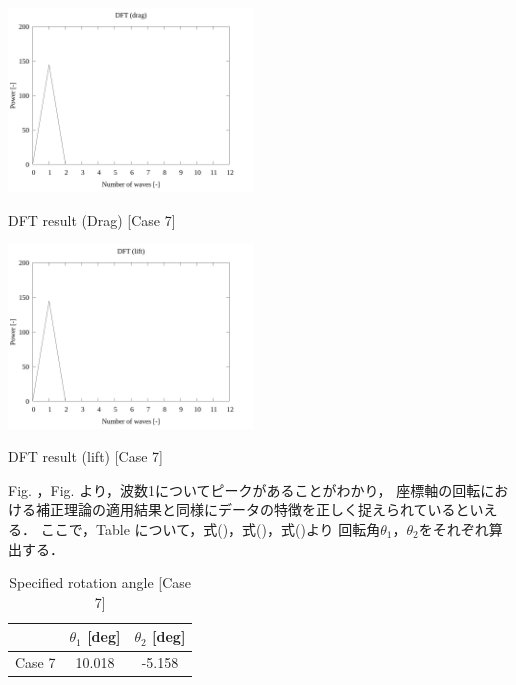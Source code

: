 \newpage

\begin{multicols}{2}
    \begin{figure_here}
        \begin{center}
        \includegraphics[width=65mm]{../../02_workspace/result/simulation_tx=10.0_ty=-5.0_dx=5.00_dy=-2.50/plot/07/07-3_dft-drag.png}
        \caption{DFT result (Drag) [Case 7]}
        \includegraphics[width=65mm]{../../02_workspace/result/simulation_tx=10.0_ty=-5.0_dx=5.00_dy=-2.50/plot/07/07-4_dft-lift.png}
        \caption{DFT result (lift) [Case 7]}
        \end{center}
    \end{figure_here}
\end{multicols}

Fig. ，Fig. より，波数1についてピークがあることがわかり，
座標軸の回転における補正理論の適用結果と同様にデータの特徴を正しく捉えられているといえる．
ここで，Table について，式()，式()，式()より
回転角$\theta_1$，$\theta_2$をそれぞれ算出する．

\begin{table}[htbp]
    \begin{center}
        \caption{Specified rotation angle [Case 7]}
        \begin{tabular}{|p{30mm}|p{20mm}|p{20mm}|}
            \hline
            \multicolumn{1}{|c|}{}       & \multicolumn{1}{|c|}{$\theta_1$ [deg]}   & \multicolumn{1}{|c|}{$\theta_2$ [deg]} \\ \hline
            \multicolumn{1}{|c|}{Case 7} & \multicolumn{1}{|c|}{10.018}     & \multicolumn{1}{|c|}{-5.158}         \\ \hline
        \end{tabular}
    \end{center}
\end{table}



